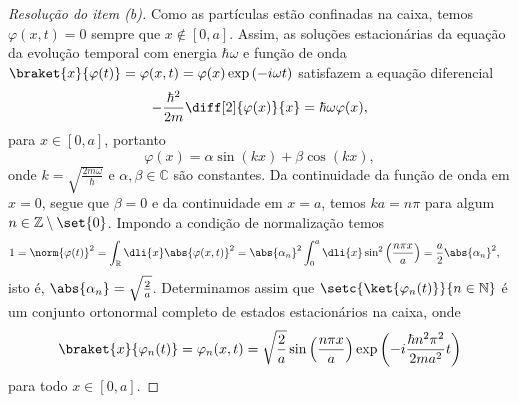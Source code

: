 \begin{proof}[Resolução do item (b)]
    Como as partículas estão confinadas na caixa, temos \(\varphi(x,t) = 0\) sempre que \(x \notin [0,a]\). Assim, as soluções estacionárias da equação da evolução temporal com energia \(\hbar \omega\) e função de onda \(\braket{x}{\varphi(t)} = \varphi(x,t) = \varphi(x) \exp\left(-i \omega t\right)\) satisfazem a equação diferencial
    \begin{equation*}
        -\frac{\hbar^2}{2m} \diff[2]{\varphi(x)}{x} = \hbar\omega \varphi(x),
    \end{equation*}
    para \(x \in [0,a]\), portanto
    \begin{equation*}
        \varphi(x) = \alpha \sin(k x) + \beta\cos(kx),
    \end{equation*}
    onde \(k = \sqrt{\frac{2 m \omega}{\hbar}}\) e \(\alpha, \beta \in \mathbb{C}\) são constantes. Da continuidade da função de onda em \(x = 0\), segue que \(\beta = 0\) e da continuidade em \(x = a\), temos \(ka = n\pi\) para algum \(n \in \mathbb{Z}\setminus\set{0}\). Impondo a condição de normalização temos
    \begin{align*}
        1 = \norm{\varphi(t)}^2 = \int_{\mathbb{R}} \dli{x} \abs{\varphi(x, t)}^2 &= \abs{\alpha_n}^2 \int_0^a \dli{x} \sin^2\left(\frac{n\pi x}{a}\right) = \frac{a}{2}\abs{\alpha_n}^2,
    \end{align*}
    isto é, \(\abs{\alpha_n} = \sqrt{\frac{2}{a}}\). Determinamos assim que \(\setc{\ket{\varphi_n(t)}}{n \in \mathbb{N}}\) é um conjunto ortonormal completo de estados estacionários na caixa, onde
    \begin{equation*}
        \braket{x}{\varphi_n(t)} = \varphi_n(x,t) = \sqrt{\frac{2}{a}} \sin\left(\frac{n\pi x}{a}\right)\exp\left(-i \frac{\hbar n^2 \pi^2}{2ma^2}t\right)
    \end{equation*}
    para todo \(x \in [0,a]\).


\end{proof}
